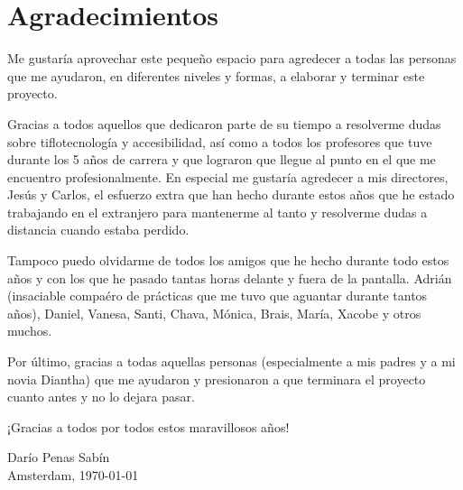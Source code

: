 %
%

\section*{Agradecimientos}

Me gustaría aprovechar este pequeño espacio para agredecer a todas las personas que me ayudaron, en diferentes niveles y formas, a elaborar y terminar este proyecto.

Gracias a todos aquellos que dedicaron parte de su tiempo a resolverme dudas sobre tiflotecnología y accesibilidad, así como a todos los profesores que tuve durante los 5 años de carrera y que lograron que llegue al punto en el que me encuentro profesionalmente. En especial me gustaría agredecer a mis directores, Jesús y Carlos, el esfuerzo extra que han hecho durante estos años que he estado trabajando en el extranjero para mantenerme al tanto y resolverme dudas a distancia cuando estaba perdido.

Tampoco puedo olvidarme de todos los amigos que he hecho durante todo estos años y con los que he pasado tantas horas delante y fuera de la pantalla. Adrián (insaciable compaéro de prácticas que me tuvo que aguantar durante tantos años), Daniel, Vanesa, Santi, Chava, Mónica, Brais, María, Xacobe y otros muchos.

Por último, gracias a todas aquellas personas (especialmente a mis padres y a mi novia Diantha) que me ayudaron y presionaron a que terminara el proyecto cuanto antes y no lo dejara pasar.

¡Gracias a todos por todos estos maravillosos años!

\begin{flushright}
  Darío Penas Sabín \\
  Amsterdam, \today
\end{flushright}

